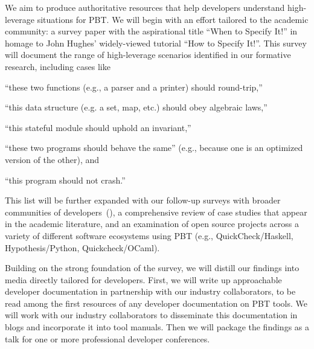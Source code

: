 We aim to produce authoritative resources that help developers understand
high-leverage situations for PBT. We will begin with an effort
tailored to the academic community: a survey paper with the
aspirational title ``When to Specify It!'' in homage to John Hughes'
widely-viewed tutorial ``How to Specify It!''. This survey will
document the range of high-leverage scenarios identified in our formative
research, including cases like
\begin{enumerate*}[label=(\arabic{enumi})]
\item ``these two functions (e.g., a parser and a printer) should round-trip,''
\item ``this data structure (e.g. a set, map, etc.) should obey algebraic laws,''
\item ``this stateful module should uphold an invariant,''
\item ``these two programs should behave the same'' (e.g., because one
is an optimized version of the other),
and
\item ``this program should not crash.''
\end{enumerate*}
This list will be further expanded with our follow-up surveys with broader
communities of developers~(), a comprehensive
review of case studies that appear in
the academic literature, and an examination of open source projects across a
variety of different software ecosystems using PBT (e.g.,
QuickCheck/Haskell, Hypothesis/Python, Quickcheck/OCaml).

Building on the strong foundation of the survey, we will distill our findings
into media directly tailored for developers. First, we will write up
approachable developer documentation in partnership with our industry
collaborators, to be read among the first resources of any developer
documentation on PBT tools. We will work with our industry collaborators to
disseminate this documentation in blogs and incorporate it into tool
manuals. Then we will package the findings as a talk for one or more
professional developer conferences.


